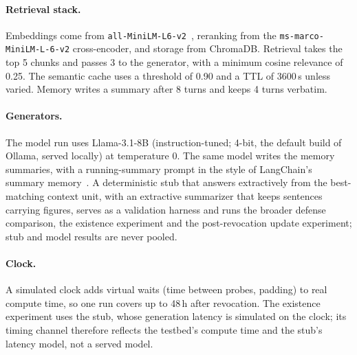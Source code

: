 \paragraph{Retrieval stack.}
Embeddings come from \texttt{all-MiniLM-L6-v2}~\cite{reimers2019sbert,wang2020minilm}, reranking from
the \texttt{ms-marco-MiniLM-L-6-v2} cross-encoder, and storage from ChromaDB. Retrieval takes the top 5
chunks and passes 3 to the generator, with a minimum cosine relevance of 0.25. The semantic cache uses
a threshold of 0.90 and a TTL of 3600\,s unless varied. Memory writes a summary after 8 turns and keeps
4 turns verbatim.

\paragraph{Generators.}
The model run uses Llama-3.1-8B (instruction-tuned; 4-bit, the default build of Ollama, served
locally) at temperature 0. The same model writes the memory summaries, with a running-summary prompt in the style of
LangChain's summary memory~\cite{doc_langchain_summary}. A deterministic stub that answers
extractively from the best-matching context unit, with an extractive summarizer that keeps sentences
carrying figures, serves as a validation harness and runs the broader defense comparison, the
existence experiment and the post-revocation update experiment; stub and model results are never
pooled.

\paragraph{Clock.}
A simulated clock adds virtual waits (time between probes, padding) to real compute time, so one run
covers up to 48\,h after revocation. The existence experiment uses the stub, whose generation
latency is simulated on the clock; its timing channel therefore reflects the testbed's compute time
and the stub's latency model, not a served model.
